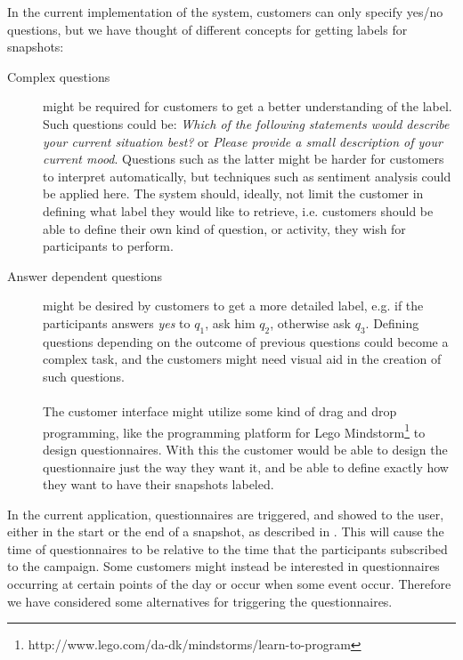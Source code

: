 In the current implementation of the system, customers can only specify yes/no questions, but we have thought of different concepts for getting labels for snapshots:

\begin{description}
    \item[Complex questions] might be required for customers to get a better understanding of the label. Such questions could be: \emph{Which of the following statements would describe your current situation best?} or \emph{Please provide a small description of your current mood}. Questions such as the latter might be harder for customers to interpret automatically, but techniques such as sentiment analysis \parencite{pang2008opinion} could be applied here. The system should, ideally, not limit the customer in defining what label they would like to retrieve, i.e. customers should be able to define their own kind of question, or activity, they wish for participants to perform. 

    \item[Answer dependent questions] might be desired by customers to get a more detailed label, e.g. if the participants answers \emph{yes} to $q_1$, ask him $q_2$, otherwise ask $q_3$. Defining questions depending on the outcome of previous questions could become a complex task, and the customers might need visual aid in the creation of such questions.
    \\\\
    The customer interface might utilize some kind of drag and drop programming, like the programming platform for Lego Mindstorm\footnote{http://www.lego.com/da-dk/mindstorms/learn-to-program} to design questionnaires. With this the customer would be able to design the questionnaire just the way they want it, and be able to define exactly how they want to have their snapshots labeled. 
\end{description}

In the current application, questionnaires are triggered, and showed to the user, either in the start or the end of a snapshot, as described in . This will cause the time of questionnaires to be relative to the time that the participants subscribed to the campaign. Some customers might instead be interested in questionnaires occurring at certain points of the day or occur when some event occur. Therefore we have considered some alternatives for triggering the questionnaires.

